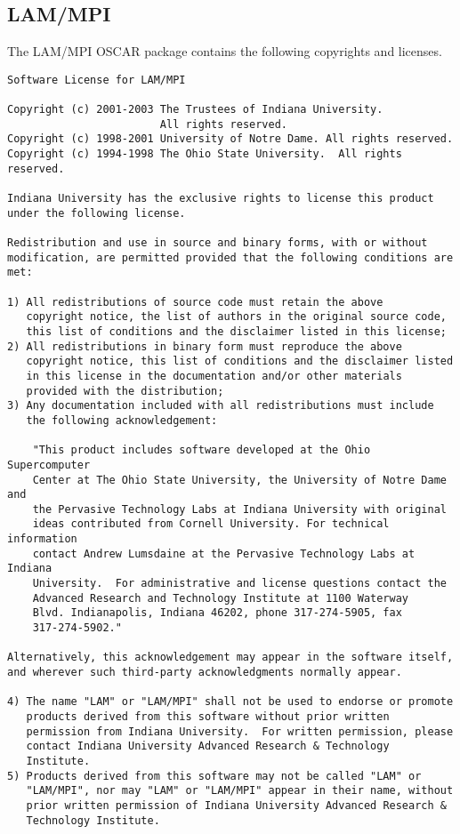 %
%

\subsection{LAM/MPI}
The LAM/MPI OSCAR package contains the following copyrights and
licenses.

\begin{verbatim}
Software License for LAM/MPI

Copyright (c) 2001-2003 The Trustees of Indiana University.  
                        All rights reserved.
Copyright (c) 1998-2001 University of Notre Dame. All rights reserved.
Copyright (c) 1994-1998 The Ohio State University.  All rights reserved.

Indiana University has the exclusive rights to license this product
under the following license.

Redistribution and use in source and binary forms, with or without
modification, are permitted provided that the following conditions are
met:

1) All redistributions of source code must retain the above
   copyright notice, the list of authors in the original source code,
   this list of conditions and the disclaimer listed in this license; 
2) All redistributions in binary form must reproduce the above
   copyright notice, this list of conditions and the disclaimer listed
   in this license in the documentation and/or other materials
   provided with the distribution; 
3) Any documentation included with all redistributions must include
   the following acknowledgement:

    "This product includes software developed at the Ohio Supercomputer
    Center at The Ohio State University, the University of Notre Dame and
    the Pervasive Technology Labs at Indiana University with original
    ideas contributed from Cornell University. For technical information
    contact Andrew Lumsdaine at the Pervasive Technology Labs at Indiana
    University.  For administrative and license questions contact the
    Advanced Research and Technology Institute at 1100 Waterway
    Blvd. Indianapolis, Indiana 46202, phone 317-274-5905, fax
    317-274-5902."

Alternatively, this acknowledgement may appear in the software itself,
and wherever such third-party acknowledgments normally appear.

4) The name "LAM" or "LAM/MPI" shall not be used to endorse or promote
   products derived from this software without prior written
   permission from Indiana University.  For written permission, please
   contact Indiana University Advanced Research & Technology
   Institute.  
5) Products derived from this software may not be called "LAM" or
   "LAM/MPI", nor may "LAM" or "LAM/MPI" appear in their name, without
   prior written permission of Indiana University Advanced Research &
   Technology Institute. 


\end{verbatim}
